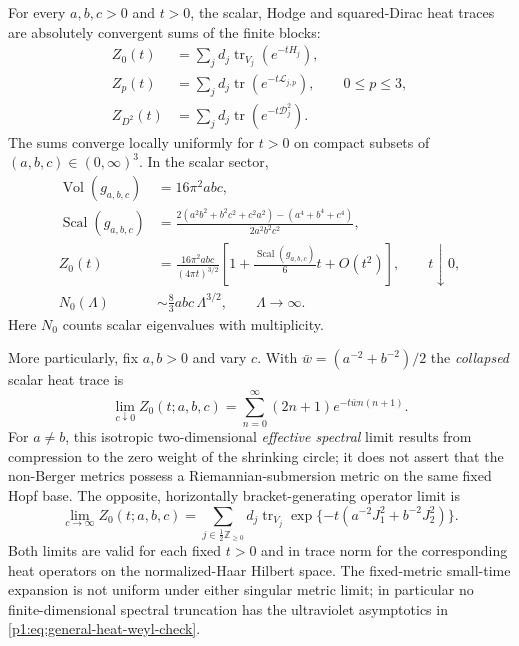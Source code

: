 \documentclass[11pt]{article}
\begin{document}
\begin{theorem}
\label{p1:thm:general-spectral-heat-and-limits}
For every $a,b,c>0$ and $t>0$, the scalar, Hodge and squared-Dirac
heat traces are absolutely convergent sums of the finite blocks:
\begin{equation}\label{p1:eq:general-spectral-heat-traces}
\begin{split}
 Z_0(t)&=\sum_jd_j\operatorname{tr}_{V_j}(e^{-tH_j}),\\
 Z_p(t)&=\sum_jd_j\operatorname{tr}(e^{-t\mathscr L_{j,p}}),\qquad 0\le p\le3,\\
 Z_{D^2}(t)&=\sum_jd_j\operatorname{tr}(e^{-t\mathscr D_j^2}).
\end{split}
\end{equation}
The sums converge locally uniformly for $t>0$ on compact subsets of
$(a,b,c)\in(0,\infty)^3$.  In the scalar sector,
\begin{equation}\label{p1:eq:general-heat-weyl-check}
\begin{split}
 \operatorname{Vol}(g_{a,b,c})&=16\pi^2abc,\\
 \operatorname{Scal}(g_{a,b,c})
   &=\frac{2(a^2b^2+b^2c^2+c^2a^2)
            -(a^4+b^4+c^4)}{2a^2b^2c^2},\\
 Z_0(t)&=\frac{16\pi^2abc}{(4\pi t)^{3/2}}
      \left[1+\frac{\operatorname{Scal}(g_{a,b,c})}{6}t
                +O(t^2)\right],\qquad t\downarrow0,\\
 N_0(\Lambda)&\sim \frac{8}{3}abc\,\Lambda^{3/2},
                  \qquad\Lambda\longrightarrow\infty.
\end{split}
\end{equation}
Here $N_0$ counts scalar eigenvalues with multiplicity.

More particularly, fix $a,b>0$ and vary $c$.  With
$\bar w=(a^{-2}+b^{-2})/2$ the \emph{collapsed} scalar heat trace is
\begin{equation}\label{p1:eq:general-spectral-collapse-limit}
 \lim_{c\downarrow0}Z_0(t;a,b,c)
    =\sum_{n=0}^\infty(2n+1)e^{-t\bar w n(n+1)}.
\end{equation}
For $a\ne b$, this isotropic two-dimensional \emph{effective spectral}
limit results from compression to the zero weight of the shrinking
circle; it does not assert that the non-Berger metrics possess a
Riemannian-submersion metric on the same fixed Hopf base.
The opposite, horizontally bracket-generating operator limit is
\begin{equation}\label{p1:eq:general-spectral-horizontal-limit}
 \lim_{c\to\infty} Z_0(t;a,b,c)
   =\sum_{j\in\frac12\mathbb Z_{\ge0}}d_j
      \operatorname{tr}_{V_j}
        \exp\{-t(a^{-2}J_1^2+b^{-2}J_2^2)\}.
\end{equation}
Both limits are valid for each fixed $t>0$ and in trace norm for the
corresponding heat operators on the normalized-Haar Hilbert space.
The fixed-metric small-time expansion is not uniform under either singular
metric limit; in particular no finite-dimensional spectral truncation
has the ultraviolet asymptotics in
\eqref{p1:eq:general-heat-weyl-check}.
\end{theorem}
\end{document}
